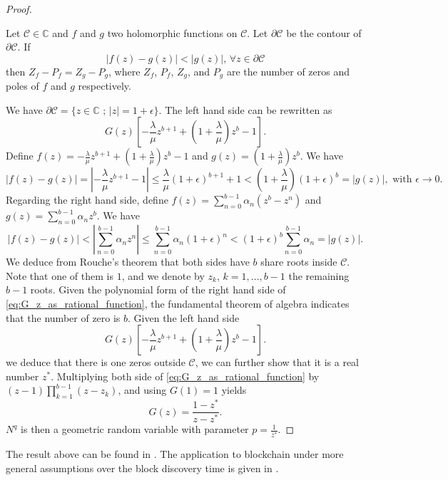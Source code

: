 \begin{proof}
\begin{lemma}
Let $\mathcal{C}\in \mathbb{C}$ and $f$ and $g$ two holomorphic functions on $\mathcal{C}$. Let $\partial\mathcal{C}$ be the contour of $\partial\mathcal{C}$. If 
$$
|f(z)-g(z)|<|g(z)|\text{, }\forall z\in\partial\mathcal{C}
$$ 
then $Z_f-P_f = Z_g-P_g$, where $Z_f$, $P_f$, $Z_g$, and $P_g$ are the number of zeros and poles of $f$ and $g$ respectively.
\end{lemma}
We have $\partial\mathcal{C} =\{z\in\mathbb{C}\text{ ; }|z| =1+\epsilon\}$. The left hand side can be rewritten as
$$
G(z)\left[-\frac{\lambda}{\mu}z^{b+1} + \left(1 + \frac{\lambda}{\mu}\right)z^b -1\right].
$$
Define $f(z) = -\frac{\lambda}{\mu}z^{b+1} + \left(1 + \frac{\lambda}{\mu}\right)z^b -1$ and $g(z)=\left(1 + \frac{\lambda}{\mu}\right)z^b$. We have 
 $$
|f(z) - g(z)| = |-\frac{\lambda}{\mu}z^{b+1}-1|\leq \frac{\lambda}{\mu}(1+\epsilon)^{b+1}+1< \left(1 + \frac{\lambda}{\mu}\right)(1+\epsilon)^b= |g(z)| ,\text{ with }\epsilon \rightarrow 0. 
$$
Regarding the right hand side, define $f(z) = \sum_{n=0}^{b-1}\alpha_n(z^b - z^n)$ and $g(z) =\sum_{n=0}^{b-1}\alpha_nz^b $. We have 
$$
|f(z) - g(z)| < |\sum_{n=0}^{b-1}\alpha_n z^n| \leq \sum_{n=0}^{b-1}\alpha_n (1+\epsilon)^n<(1+\epsilon)^b\sum_{n=0}^{b-1}\alpha_n = |g(z)|.
$$
We deduce from Rouche's theorem that both sides have $b$ share roots inside $\mathcal{C}$. Note that one of them is $1$, and we denote by $z_k$, $k = 1,\ldots, b-1$ the remaining $b-1$ roots. Given the polynomial form of the right hand side of \eqref{eq:G_z_as_rational_function}, the fundamental theorem of algebra indicates that the number of zero is $b$. Given the left hand side 
$$
G(z)\left[-\frac{\lambda}{\mu}z^{b+1} + \left(1 + \frac{\lambda}{\mu}\right)z^b -1\right].
$$
we deduce that there is one zeros outside $\mathcal{C}$, we can further show that it is a real number $z^\ast$. Multiplying both side of \eqref{eq:G_z_as_rational_function} by $(z-1)\prod_{k =1}^{b-1}(z-z_k)$, and using $G(1)=1$ yields
$$
G(z) = \frac{1-z^\ast}{z-z^{\ast}}.
$$
$N^q$ is then a geometric random variable with parameter $p = \frac{1}{z^\ast}.$
\end{proof}
The result above can be found in \citet{Bailey1954}. The application to blockchain under more general assumptions over the block discovery time is given in \citet{Kawase2017}.
